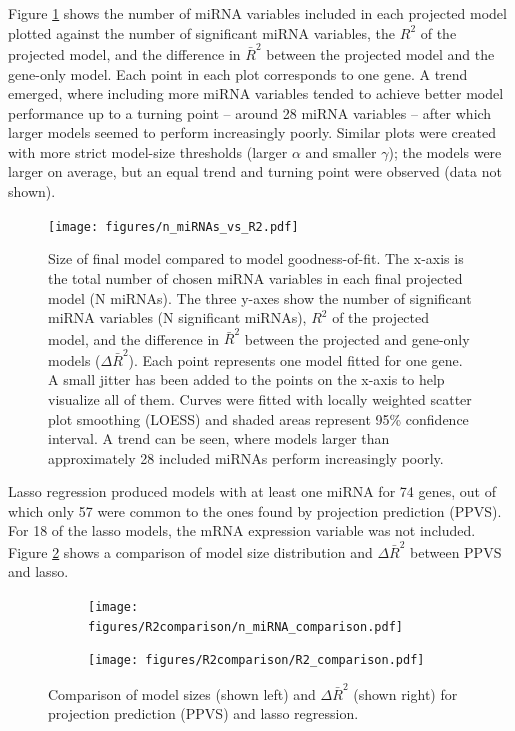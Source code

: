 Figure \ref{fig:n-miRNAs-vs-R2} shows the number of miRNA variables included in
each projected model plotted against the number of significant miRNA
variables, the $R^2$ of the projected model, and the difference in $\bar{R}^2$
between the projected model and the gene-only model. Each point in each plot
corresponds to one gene. A trend emerged, where including more
miRNA variables tended to achieve better model performance up to a turning point --
around 28 miRNA variables -- after which larger models seemed to perform
increasingly poorly. Similar plots were created with more strict model-size
thresholds (larger $\alpha$ and smaller $\gamma$); the models were larger on
average, but an equal trend and turning point were observed (data not shown).

\begin{figure}[!h]
  \centering
  \texttt{[image: figures/n\_miRNAs\_vs\_R2.pdf]}
  \caption{Size of final model compared to model goodness-of-fit. The x-axis is
  the total number of chosen miRNA variables in each final projected model (N miRNAs).
  The three y-axes show the number of significant miRNA variables (N significant miRNAs),
  $R^2$ of the projected model, and the
  difference in $\bar{R}^2$ between the projected and gene-only models
  ($\Delta\bar{R}^2$). Each point represents one model fitted for one gene. A
  small jitter has been added to the points on the x-axis to help visualize all of them.
  Curves were fitted with locally weighted scatter plot smoothing (LOESS) and
  shaded areas represent 95\% confidence interval. A trend can be seen, where
  models larger than approximately 28 included miRNAs perform increasingly poorly.}
  \label{fig:n-miRNAs-vs-R2}
\end{figure}

Lasso regression produced models with at least one miRNA for 74 genes, out of
which only 57 were common to the ones found by projection prediction (PPVS).
For 18 of the lasso models, the mRNA expression variable was not included.
Figure \ref{fig:model-size} shows a comparison of model size distribution
and $\Delta\bar{R}^2$ between PPVS and lasso.

\begin{figure}[!h]
  \centering
  \begin{subfigure}{.45\textwidth}
    \texttt{[image: figures/R2comparison/n\_miRNA\_comparison.pdf]}
  \end{subfigure}
  \begin{subfigure}{.45\textwidth}
    \texttt{[image: figures/R2comparison/R2\_comparison.pdf]}
  \end{subfigure}

  \caption{Comparison of model sizes (shown left) and $\Delta\bar{R}^2$ (shown right) for
      projection prediction (PPVS) and lasso regression.}
  \label{fig:model-size}
\end{figure}




